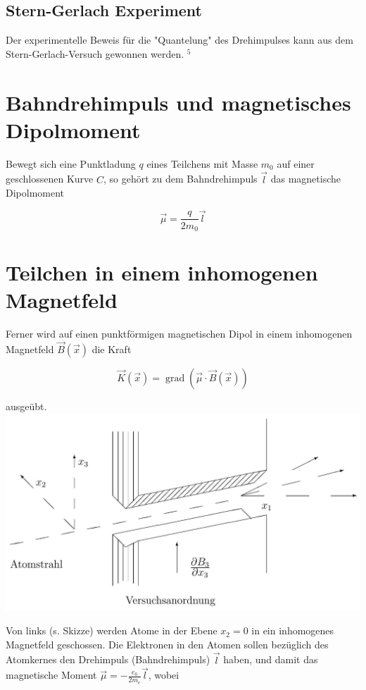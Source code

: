 \documentclass[10pt, letterpaper]{article}
\begin{document}
\subsection*{Stern-Gerlach Experiment}
Der experimentelle Beweis für die "Quantelung" des Drehimpulses kann aus dem Stern-Gerlach-Versuch gewonnen werden. ${ }^{5}$

\section*{Bahndrehimpuls und magnetisches Dipolmoment}
Bewegt sich eine Punktladung $q$ eines Teilchens mit Masse $m_{0}$ auf einer geschlossenen Kurve $C$, so gehört zu dem Bahndrehimpuls $\vec{l}$ das magnetische Dipolmoment

$$
\vec{\mu}=\frac{q}{2 m_{0}} \vec{l}
$$

\section*{Teilchen in einem inhomogenen Magnetfeld}
Ferner wird auf einen punktförmigen magnetischen Dipol in einem inhomogenen Magnetfeld $\vec{B}(\vec{x})$ die Kraft

$$
\vec{K}(\vec{x})=\operatorname{grad}(\vec{\mu} \cdot \vec{B}(\vec{x}))
$$

ausgeübt.\\
\includegraphics[scale=0.2, center]{2025_05_21_5017aafc65fbb33f9443g-14}

Von links (s. Skizze) werden Atome in der Ebene $x_{2}=0$ in ein inhomogenes Magnetfeld geschossen. Die Elektronen in den Atomen sollen bezüglich des Atomkernes den Drehimpuls (Bahndrehimpuls) $\vec{l}$ haben, und damit das magnetische Moment $\vec{\mu}=-\frac{e_{0}}{2 m_{e}} \vec{l}$, wobei
\end{document}
